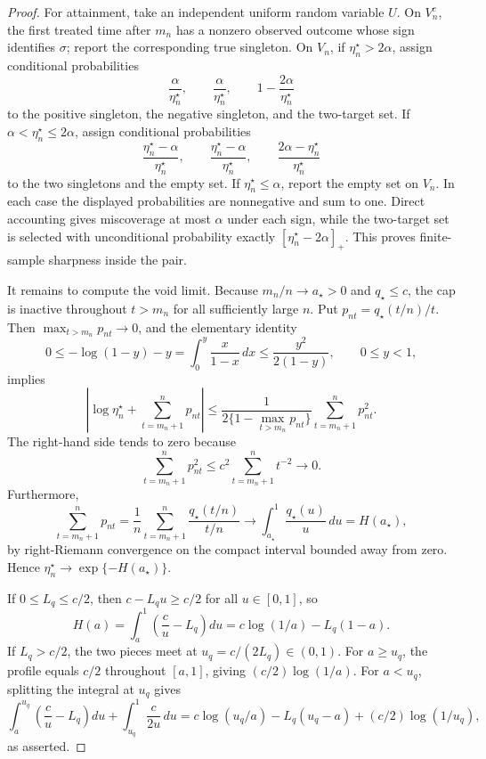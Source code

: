 \documentclass{article}
\begin{document}
\begin{proof}
For attainment, take an independent uniform random variable \(U\). On \(V_n^c\), the first treated time after \(m_n\) has a nonzero observed outcome whose sign identifies \(\sigma\); report the corresponding true singleton. On \(V_n\), if \(\eta_n^\star>2\alpha\), assign conditional probabilities
\[
 \frac{\alpha}{\eta_n^\star},\qquad
 \frac{\alpha}{\eta_n^\star},\qquad
 1-\frac{2\alpha}{\eta_n^\star}
\]
to the positive singleton, the negative singleton, and the two-target set. If \(\alpha<\eta_n^\star\le2\alpha\), assign conditional probabilities
\[
 \frac{\eta_n^\star-\alpha}{\eta_n^\star},\qquad
 \frac{\eta_n^\star-\alpha}{\eta_n^\star},\qquad
 \frac{2\alpha-\eta_n^\star}{\eta_n^\star}
\]
to the two singletons and the empty set. If \(\eta_n^\star\le\alpha\), report the empty set on \(V_n\). In each case the displayed probabilities are nonnegative and sum to one. Direct accounting gives miscoverage at most \(\alpha\) under each sign, while the two-target set is selected with unconditional probability exactly \([\eta_n^\star-2\alpha]_+\). This proves finite-sample sharpness inside the pair.

It remains to compute the void limit. Because \(m_n/n\to a_\star>0\) and \(q_\star\le c\), the cap is inactive throughout \(t>m_n\) for all sufficiently large \(n\). Put \(p_{nt}=q_\star(t/n)/t\). Then \(\max_{t>m_n}p_{nt}\to0\), and the elementary identity
\[
 0\le-\log(1-y)-y=\int_0^y\frac{x}{1-x}\,dx
 \le\frac{y^2}{2(1-y)},\qquad 0\le y<1,
\]
implies
\[
 \left|\log\eta_n^\star+\sum_{t=m_n+1}^np_{nt}\right|
 \le
 \frac{1}{2\{1-\max_{t>m_n}p_{nt}\}}
 \sum_{t=m_n+1}^np_{nt}^2.
\]
The right-hand side tends to zero because
\[
 \sum_{t=m_n+1}^np_{nt}^2
 \le c^2\sum_{t=m_n+1}^nt^{-2}\longrightarrow0.
\]
Furthermore,
\[
 \sum_{t=m_n+1}^np_{nt}
 =\frac1n\sum_{t=m_n+1}^n
 \frac{q_\star(t/n)}{t/n}
 \longrightarrow\int_{a_\star}^1\frac{q_\star(u)}u\,du=H(a_\star),
\]
by right-Riemann convergence on the compact interval bounded away from zero. Hence \(\eta_n^\star\to\exp\{-H(a_\star)\}\).

If \(0\le L_q\le c/2\), then \(c-L_qu\ge c/2\) for all \(u\in[0,1]\), so
\[
 H(a)=\int_a^1\left(\frac cu-L_q\right)du
 =c\log(1/a)-L_q(1-a).
\]
If \(L_q>c/2\), the two pieces meet at \(u_q=c/(2L_q)\in(0,1)\). For \(a\ge u_q\), the profile equals \(c/2\) throughout \([a,1]\), giving \((c/2)\log(1/a)\). For \(a<u_q\), splitting the integral at \(u_q\) gives
\[
 \int_a^{u_q}\left(\frac cu-L_q\right)du
 +\int_{u_q}^1\frac{c}{2u}\,du
 =c\log(u_q/a)-L_q(u_q-a)+(c/2)\log(1/u_q),
\]
as asserted.
\end{proof}
\end{document}
